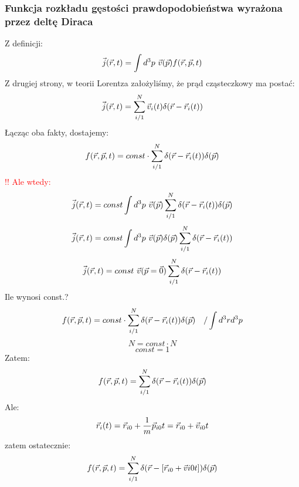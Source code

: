 \subsubsection{Funkcja rozkładu gęstości prawdopodobieństwa wyrażona przez deltę Diraca}
Z definicji:
\begin{equation}\vec{j}(\vec{r},t)=\int d^3 p~\vec{v}(\vec{p})f(\vec{r},\vec{p},t)\end{equation}
Z drugiej strony, w teorii Lorentza założyliśmy, że prąd cząsteczkowy ma postać:
\begin{equation}\vec{j}(\vec{r},t)=\sum_{i/1}^N\vec{v}_i(t)\delta(\vec{r}-\vec{r}_i(t))\end{equation}
Łącząc oba fakty, dostajemy:
\begin{equation}f(\vec{r},\vec{p},t)=const\cdot\sum_{i/1}^N\delta(\vec{r}-\vec{r}_i(t))\delta(\vec{p})
\end{equation}
\textcolor{red}{!! Ale wtedy:
\begin{equation}\vec{j}(\vec{r},t)=const \int d^3p~\vec{v}(\vec{p})\sum_{i/1}^N\delta(\vec{r}-\vec{r}_i(t))\delta(\vec{p})\end{equation}
\begin{equation}\vec{j}(\vec{r},t)= const \int d^3p~\vec{v}(\vec{p}) \delta(\vec{p}) \sum_{i/1}^N\delta(\vec{r}-\vec{r}_i(t))
\end{equation}
\begin{equation}\vec{j}(\vec{r},t)=const~\vec{v}(\vec{p}=\vec{0}) \sum_{i/1}^N\delta(\vec{r}-\vec{r}_i(t))
\end{equation}}
Ile wynosi const.?
\begin{equation}f(\vec{r},\vec{p},t)=const\cdot\sum_{i/1}^N\delta(\vec{r}-\vec{r}_i(t))\delta(\vec{p})~~~/\int d^3rd^3p \nonumber \end{equation}
\begin{equation}N=const\cdot N \nonumber \end{equation}
\begin{equation}const=1 \nonumber \end{equation}
Zatem:
\begin{equation}f(\vec{r},\vec{p},t)=\sum_{i/1}^N\delta(\vec{r}-\vec{r}_i(t))\delta(\vec{p}) \end{equation}
Ale:
\begin{equation}\vec{r}_i(t)=\vec{r}_{i0}+\frac{1}{m}\vec{p}_{i0}t=\vec{r}_{i0}+\vec{v}_{i0}t\end{equation}
zatem ostatecznie:
\begin{equation}f(\vec{r},\vec{p},t)=\sum_{i/1}^N\delta(\vec{r}-[\vec{r}_{i0}+\vec{v}{i0}t])\delta(\vec{p}) \end{equation}
